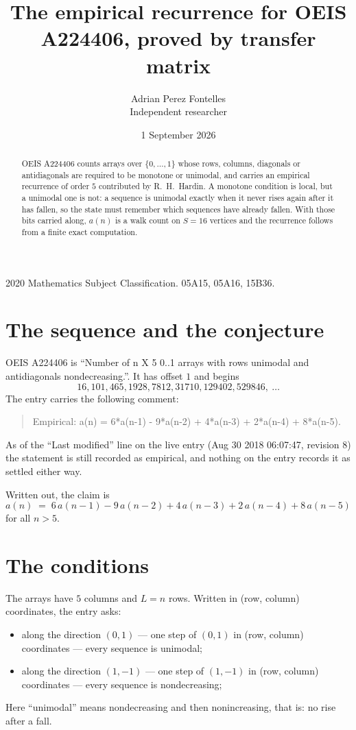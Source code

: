 \documentclass[11pt,a4paper]{article}
\title{The empirical recurrence for OEIS A224406, proved by transfer matrix}
\author{Adrian Perez Fontelles\\ \small Independent researcher}
\date{1 September 2026}
\theoremstyle{plain}
\theoremstyle{definition}
\begin{document}
\maketitle

\begin{abstract}
OEIS A224406 counts arrays over $\{0,\dots,1\}$ whose rows, columns, diagonals or
antidiagonals are required to be monotone or unimodal, and carries an empirical recurrence of
order $5$ contributed by R.~H.~Hardin. A monotone condition is local, but a unimodal one
is not: a sequence is unimodal exactly when it never rises again after it has fallen, so the
state must remember which sequences have already fallen. With those bits carried along, $a(n)$
is a walk count on $S=16$ vertices and the recurrence follows from a finite exact
computation.
\end{abstract}

\noindent\small 2020 Mathematics Subject Classification. 05A15, 05A16, 15B36.\normalsize

\section{The sequence and the conjecture}

OEIS A224406 is ``Number of n X 5 0..1 arrays with rows unimodal and antidiagonals nondecreasing.''. It has offset $1$ and begins
\[
16, 101, 465, 1928, 7812, 31710, 129402, 529846,\ \dots
\]
The entry carries the following comment:
\begin{quote}\small
Empirical: a(n) = 6*a(n-1) - 9*a(n-2) + 4*a(n-3) + 2*a(n-4) + 8*a(n-5).
\end{quote}
As of the ``Last modified'' line on the live entry (Aug 30 2018 06:07:47, revision 8) the statement is
still recorded as empirical, and nothing on the entry records it as settled either way.

Written out, the claim is
\begin{equation}\label{eq:conj}
a(n)\;=\;6\,a(n-1) - 9\,a(n-2) + 4\,a(n-3) + 2\,a(n-4) + 8\,a(n-5)
\end{equation}
for all $n>5$.

\section{The conditions}

The arrays have $5$ columns and $L=n$ rows. Written in (row, column)
coordinates, the entry asks:
\begin{itemize}
\item along the direction $(0,1)$ --- one step of $(0,1)$ in (row, column) coordinates --- every sequence is unimodal;
\item along the direction $(1,-1)$ --- one step of $(1,-1)$ in (row, column) coordinates --- every sequence is nondecreasing;
\end{itemize}
Here ``unimodal'' means nondecreasing and then nonincreasing, that is: no rise after a fall.
\end{document}
